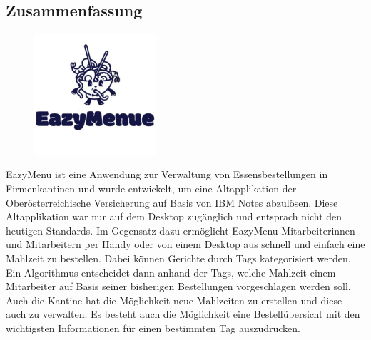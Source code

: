\begin{spacing}{1}
    \chapter*{Zusammenfassung}
\end{spacing}
\begin{figure}
    \begin{center}
      \includegraphics[width=0.4\textwidth]{pics/Logo-EazyMenue.png}
     \end{center}
\end{figure}
\author{David Ignjatovic}
EazyMenu ist eine Anwendung zur Verwaltung von Essensbestellungen in Firmenkantinen und wurde entwickelt, um eine Altapplikation der Oberösterreichische Versicherung auf Basis von IBM Notes abzulösen. 
Diese Altapplikation war nur auf dem Desktop zugänglich und entsprach nicht den heutigen Standards. 
Im Gegensatz dazu ermöglicht EazyMenu Mitarbeiterinnen und Mitarbeitern per Handy oder von einem Desktop aus schnell und einfach eine Mahlzeit zu bestellen. 
Dabei können Gerichte durch Tags kategorisiert werden. Ein Algorithmus entscheidet dann anhand der Tags, welche Mahlzeit einem Mitarbeiter auf Basis seiner bisherigen Bestellungen vorgeschlagen werden soll.
Auch die Kantine hat die Möglichkeit neue Mahlzeiten zu erstellen und diese auch zu verwalten. 
Es besteht auch die Möglichkeit eine Bestellübersicht mit den wichtigsten Informationen für einen bestimmten Tag auszudrucken.